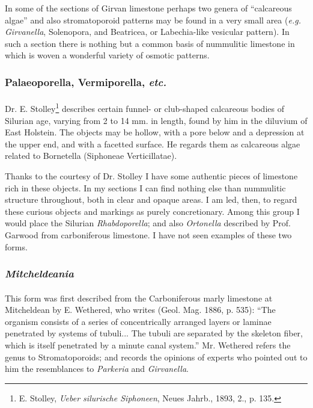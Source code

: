 \documentclass[a4paper, 12pt, oneside]{article}
\begin{document}
In some of the sections of Girvan limestone perhaps two genera of ``calcareous algae'' and also stromatoporoid patterns may be found in a very small area (\emph{e.g.} \emph{Girvanella}, Solenopora, and Beatricea, or Labechia-like vesicular pattern). In such a section there is nothing but a common basis of nummulitic limestone in which is woven a wonderful variety of osmotic patterns.

\subsubsection{Palaeoporella, Vermiporella, \emph{etc.}}
\paragraph{}
Dr. E. Stolley\footnote{E. Stolley, \emph{Ueber silurische Siphoneen}, Neues Jahrb., 1893, 2., p. 135.} describes certain funnel- or club-shaped calcareous bodies of Silurian age, varying from 2 to 14 mm. in length, found by him in the diluvium of East Holstein. The objects may be hollow, with a pore below and a depression at the upper end, and with a facetted surface. He regards them as calcareous algae related to Bornetella (Siphoneae Verticillatae).

Thanks to the courtesy of Dr. Stolley I have some authentic pieces of limestone rich in these objects. In my sections I can find nothing else than nummulitic structure throughout, both in clear and opaque areas. I am led, then, to regard these curious objects and markings as purely concretionary. Among this group I would place the Silurian \emph{Rhabdoporella}; and also \emph{Ortonella} described by Prof. Garwood from carboniferous limestone. I have not seen examples of these two forms.

\subsubsection{\emph{Mitcheldeania}}
\paragraph{}
This form was first described from the Carboniferous marly limestone at Mitcheldean by E. Wethered, who writes (Geol. Mag. 1886, p. 535): ``The organism consists of a series of concentrically arranged layers or laminae penetrated by systems of tubuli... The tubuli are separated by the skeleton fiber, which is itself penetrated by a minute canal system.'' Mr. Wethered refers the genus to Stromatoporoids; and records the opinions of experts who pointed out to him the resemblances to \emph{Parkeria} and \emph{Girvanella}.
\end{document}
